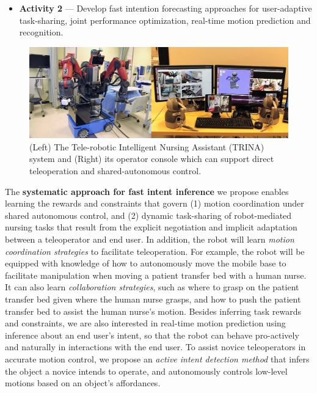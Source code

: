 \documentclass[letterpaper, 11 pt, onecolumn]{article}
\begin{document}
\begin{itemize}
\item \textbf{Activity 2} --- Develop fast intention forecasting approaches for user-adaptive task-sharing, joint performance optimization, real-time motion prediction and recognition. 
\end{itemize}

\begin{figure}
  \includegraphics[width=0.99\linewidth]{fig//TRINA_system}
    \caption{(Left) The Tele-robotic Intelligent Nursing Assistant (TRINA) system and (Right) its operator console which can support direct teleoperation and shared-autonomous control.}
    \label{fig:Trina}
\vspace{1.0ex}
\end{figure}
\noindent
The \textbf{systematic approach for fast intent inference} we propose enables learning the rewards and constraints that govern (1) motion coordination under shared autonomous control, and (2) dynamic task-sharing of robot-mediated nursing tasks that result from the explicit negotiation and implicit adaptation between a teleoperator and end user. In addition,  the robot will learn \textit{motion coordination strategies} to facilitate teleoperation. For example, the robot will be equipped with knowledge of how to autonomously move the mobile base to facilitate manipulation when moving a patient transfer bed with a human nurse. It can also learn \textit{collaboration strategies}, such as where to grasp on the patient transfer bed given where the human nurse grasps, and how to push the patient transfer bed to assist the human nurse's motion. Besides inferring task rewards and constraints, we are also interested in real-time motion prediction using inference about an end user's intent, so that the robot can behave pro-actively and naturally in interactions with the end user. To assist novice teleoperators in accurate motion control, we propose an \textit{active intent detection method} that infers the object a novice intends to operate, and autonomously controls low-level motions based on an object's affordances.
\end{document}
